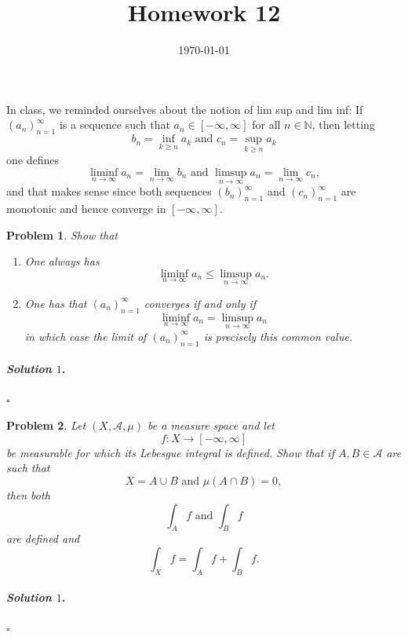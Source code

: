 \documentclass[reqno]{amsart}
\theoremstyle{plain}
\newtheorem{problem}{Problem}
\theoremstyle{definition}
\newenvironment{solution1}{\paragraph{\emph{Solution $1$}.}}{\hfill$\square$}
\begin{document}
 

\title[Homework 12]{Homework 12}

\date{\today} 
\maketitle 


In class, we reminded ourselves about the notion of lim sup and lim inf:  If $(a_{n})_{n=1}^{\infty}$ is a sequence such that $a_{n} \in [-\infty,\infty]$ for all $n \in \mathbb{N}$, then letting
$$b_{n} = \inf_{k \ge n }a_{k}  \text{ and } c_{n} = \sup_{k \ge n} a_{k}$$
one defines
$$\liminf_{n \to \infty}a_{n} = \lim_{n \to \infty}b_{n} \text{ and } \limsup_{n \to \infty}a_{n} = \lim_{n \to \infty}c_{n}, $$
and that makes sense since both sequences $(b_{n})_{n=1}^{\infty}$ and $(c_{n})_{n=1}^{\infty}$ are monotonic and hence converge in $[-\infty,\infty]$.

\begin{problem}
Show that
\begin{enumerate}
\item One always has
$$\liminf_{n \to \infty}a_{n} \le \limsup_{n \to \infty}a_{n}. $$
\item One has that $(a_{n})_{n=1}^{\infty}$ converges if and only if 
$$\liminf_{n \to \infty}a_{n} = \limsup_{n \to \infty}a_{n} $$
in which case the limit of $(a_{n})_{n=1}^{\infty}$ is precisely this common value.
\end{enumerate}
\end{problem}
\begin{solution1}

\end{solution1}

\begin{problem}
Let $(X,\mathcal{A},\mu)$ be a measure space and let
$$f:X \rightarrow [-\infty,\infty] $$
be measurable for which its Lebesgue integral is defined.  Show that if $A,B \in \mathcal{A}$ are such that
$$X = A \cup B \text{ and } \mu(A \cap B) = 0, $$
then both
$$\int_{A}f \text{ and } \int_{B}f $$
are defined and 
$$\int_{X}f = \int_{A}f + \int_{B}f. $$
\end{problem}
\begin{solution1}

\end{solution1}
\end{document}

